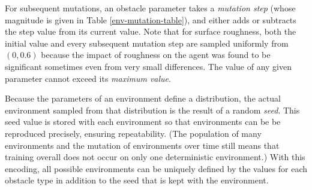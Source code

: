 \documentclass{article}
\newcommand{\jc}[1]{\comments{\textcolor{deepForestGreen}{[JC: #1]}}}
\newcommand{\comments}[1]{#1}
\begin{document}
For subsequent mutations, an obstacle parameter takes a \emph{mutation step} (whose magnitude is given in Table \ref{env-mutation-table}), and either adds or subtracts the step value from its current value.
Note that for surface roughness, both the initial value and every subsequent mutation step are sampled uniformly from $(0, 0.6)$ because the impact of roughness on the agent was found to be significant sometimes even from very small differences. 
The value of any given parameter cannot exceed its \emph{maximum value}. %

Because the parameters of an environment define a distribution, the actual environment sampled from that distribution is the result of a random \emph{seed}.  This seed value is stored with each environment so that environments can be be reproduced precisely, ensuring repeatability.  (The population of many environments and the mutation of environments over time still means that training overall does not occur on only one deterministic environment.)
With this encoding, all possible environments can be uniquely defined by the values for each obstacle type in addition to the seed that is kept with the environment. 
\end{document}
